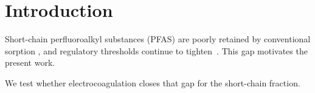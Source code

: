\section{Introduction}

Short-chain perfluoroalkyl substances (PFAS) are poorly retained by conventional
sorption \citep{example2020}, and regulatory thresholds continue to
tighten~\citep{example2019}. This gap motivates the present work.


We test whether electrocoagulation closes that gap for the short-chain fraction.
